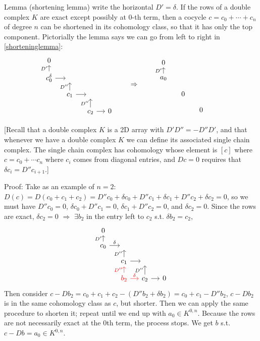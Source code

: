 \documentclass{article}
\theoremstyle{mystyle}
\theoremstyle{remark}
\numberwithin{equation}{section}
\begin{document}
Lemma (shortening lemma) write the horizontal $D'=\delta$. 
If the rows of a double complex $K$ are exact except possibly at $0$-th term, then a cocycle $c = c_0+\cdots+c_n$ of degree $n$ can be shortened in its cohomology class, so that it has only the top component. Pictorially the lemma says we can go from left to right in \eqref{shorteninglemma}:
\begin{equation}\label{shorteninglemma}\begin{tikzcd}[column sep = small, row sep = small]
0&~&~&~\\c_0\ar[u,"D'"]\ar[r]^\delta &~&~&~\\ ~& c_1\ar[u,"D''"] \ar[r] &~&~\\
~&~&c_2\ar[u,"D''"] \ar[r] &0
\end{tikzcd}
\qquad
\Rightarrow\qquad
\begin{tikzcd}[column sep = small, row sep = small]
0 &~&~&~\\a_0\ar[u,"D'"]&~&~&~\\~&0&~&~\\~&~&0&~
\end{tikzcd}
\end{equation}

[Recall that a double complex $K$ is a 2D array with $D'D''=-D''D'$, and that whenever we have a double complex $K$ we can define its associated single chain complex. The single chain complex has cohomology whose element is $[c]$ where $c = c_0+\cdots c_n$ where $c_i$ comes from diagonal entries, and $Dc=0$ requires that $\delta c_i = D''c_{i+1}$.]

Proof: Take as an example of $n=2$: $D(c) = D(c_0+c_1+c_2) = D''c_0+\delta c_0+D''c_1+\delta c_1+D''c_2+\delta c_2=0$, so we must have $D''c_0=0$, $\delta c_0+D''c_1=0$, $\delta c_1+D''c_2=0$, and $\delta c_2=0$. Since the rows are exact, $\delta c_2=0$ $\Rightarrow$ $\exists b_2$ in the entry left to $c_2$ s.t. $\delta b_2 = c_2$, 
$$
\begin{tikzcd}[column sep = small, row sep = small]
0&~&~&~\\c_0\ar[u,"D'"]\ar[r,"\delta"] &~&~&~\\ ~& c_1\ar[u,"D''"] \ar[r] &~&~\\
&\textcolor{red}{b_2} \ar[r,red,"\delta"]\ar[u,red,"D''"]&c_2\ar[u,"D''"] \ar[r] &0
\end{tikzcd}
$$
Then consider $c-Db_2 = c_0+c_1+c_2 -(D''b_2+\delta b_2) = c_0+c_1 - D''b_2$, $c-Db_2$ is in the same cohomology class as $c$, but shorter. Then we can apply the same procedure to shorten it; repeat until we end up with $a_0 \in K^{0,n}$. Because the rows are not necessarily exact at the $0$th term, the process stops. We get $b$ s.t. $c-Db = a_0 \in K^{0,n}$. 
\end{document}
